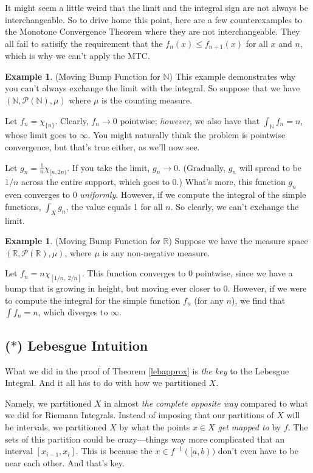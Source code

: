 \documentclass[12pt]{article}
\theoremstyle{plain}
\theoremstyle{definition}
\newtheorem{ex}[thm]{Example}
\theoremstyle{remark}
\begin{document}
It might seem a little weird that the limit and the integral sign are not always be interchangeable. So to drive home this point, here are a few counterexamples to the Monotone Convergence Theorem where they are not interchangeable. They all fail to satisify the requirement that the $f_n(x)\leq f_{n+1}(x)$ for all $x$ and $n$, which is why we can't apply the MTC.

\begin{ex}
(Moving Bump Function for $\mathbb{N}$) This example demonstrates why you can't always exchange the limit with the integral. So suppose that we have $(\mathbb{N},\mathscr{P}(\mathbb{N}),\mu)$ where $\mu$ is the counting measure. 

Let $f_n = \chi_{\{n\}}$.  Clearly, $f_n\rightarrow 0$ pointwise; \emph{however}, we also have that $\int_\mathbb{N} f_n = n$, whose limit goes to $\infty$. You might naturally think the problem is pointwise convergence, but that's true either, as we'll now see.

Let $g_n = \frac{1}{n}\chi_{[n,2n)}$. If you take the limit, $g_n\rightarrow 0$. (Gradually, $g_n$ will spread to be $1/n$ across the entire support, which goes to 0.) What's more, this function $g_n$ even converges to 0 \emph{uniformly}. However, if we compute the integral of the simple functions, $\int_X g_n$, the value equals 1 for all $n$. So clearly, we can't exchange the limit. 
\end{ex}

\begin{ex}
(Moving Bump Function for $\mathbb{R}$) Suppose we have the measure space $(\mathbb{R},\mathscr{P}(\mathbb{R}),\mu)$, where $\mu$ is any non-negative measure. 

Let $f_n = n\chi_{[1/n,\;2/n]}$. This function converges to 0 pointwise, since we have a bump that is growing in height, but moving ever closer to 0. However, if we were to compute the integral for the simple function $f_n$ (for any $n$), we find that $\int f_n = n$, which diverges to $\infty$.
\end{ex} 

\subsection{($*$) Lebesgue Intuition}

What we did in the proof of Theorem \ref{lebapprox} is \emph{the key} to the Lebesgue Integral.  And it all has to do with how we partitioned $X$.

Namely, we partitioned $X$ in almost \emph{the complete opposite way} compared to what we did for Riemann Integrals. Instead of imposing that our partitions of $X$ will be intervals, we partitioned $X$ by what the points $x\in X$ \emph{get mapped to} by $f$. The sets of this partition could be crazy---things way more complicated that an interval $[x_{i-1}, x_i]$. This is because the $x\in f^{-1}([a,b))$ don't even have to be near each other. And that's key.
\end{document}
